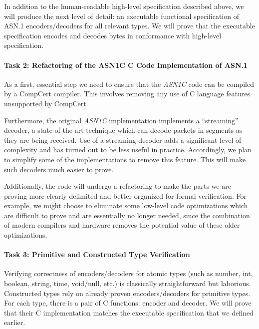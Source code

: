 \documentclass[10p,conference]{IEEEtran}
\begin{document}
In addition to the human-readable high-level specification described above, we will produce the next level of detail: an executable functional specification of ASN.1 encoders/decoders for all relevant types. We will prove that the executable specification encodes and decodes bytes in conformance with high-level specification.

\paragraph{Task 2: Refactoring of the ASN1C C Code Implementation of ASN.1}

As a first, essential step we need to ensure that the \emph{ASN1C} code can be compiled by a CompCert compiler. This involves removing any use of C language features unsupported by CompCert.

Furthermore, the original \emph{ASN1C} implementation implements a ``streaming'' decoder, a state-of-the-art technique which can decode packets in segments as they are being received. Use of a streaming decoder adds a significant level of complexity and has turned out to be less useful in practice. Accordingly, we plan to simplify some of the implementations to remove this feature. This will make such decoders much easier to prove.

Additionally, the code will undergo a refactoring to make the parts we are proving more clearly delimited and better organized for formal verification. For example, we might choose to eliminate some low-level code optimizations which are difficult to prove and are essentially no longer needed, since the combination of modern compilers and hardware removes the potential value of these older optimizations.

\paragraph{Task 3: Primitive and Constructed Type Verification}
Verifying correctness of encoders/decoders for atomic types (such as number, int, boolean, string, time, void/null, etc.) is classically straightforward but laborious. Constructed types rely on already proven encoders/decoders for primitive types. 
For each type, there is a pair of C functions: encoder and decoder. We will prove that their C implementation matches the executable specification that we defined earlier.
\end{document}
